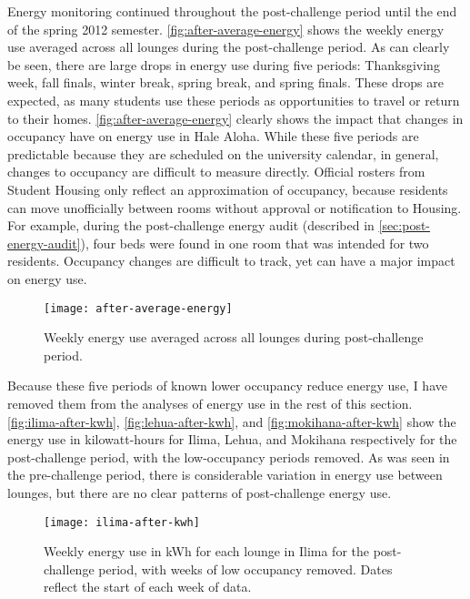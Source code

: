 Energy monitoring continued throughout the post-challenge period until the end of the spring 2012 semester. \autoref{fig:after-average-energy} shows the weekly energy use averaged across all lounges during the post-challenge period. As can clearly be seen, there are large drops in energy use during five periods: Thanksgiving week, fall finals, winter break, spring break, and spring finals. These drops are expected, as many students use these periods as opportunities to travel or return to their homes. \autoref{fig:after-average-energy} clearly shows the impact that changes in occupancy have on energy use in Hale Aloha. While these five periods are predictable because they are scheduled on the university calendar, in general, changes to occupancy are difficult to measure directly. Official rosters from Student Housing only reflect an approximation of occupancy, because residents can move unofficially between rooms without approval or notification to Housing. For example, during the post-challenge energy audit (described in \autoref{sec:post-energy-audit}), four beds were found in one room that was intended for two residents. Occupancy changes are difficult to track, yet can have a major impact on energy use.

\begin{figure}[htbp]
	\centering
	\texttt{[image: after-average-energy]}
	\caption{Weekly energy use averaged across all lounges during post-challenge period.}
	\label{fig:after-average-energy}
\end{figure}

Because these five periods of known lower occupancy reduce energy use, I have removed them from the analyses of energy use in the rest of this section. \autoref{fig:ilima-after-kwh}, \autoref{fig:lehua-after-kwh}, and \autoref{fig:mokihana-after-kwh} show the energy use in kilowatt-hours for Ilima, Lehua, and Mokihana respectively for the post-challenge period, with the low-occupancy periods removed. As was seen in the pre-challenge period, there is considerable variation in energy use between lounges, but there are no clear patterns of post-challenge energy use.

\begin{figure}[htbp]
	\centering
	\texttt{[image: ilima-after-kwh]}
	\caption[Weekly post-challenge energy use for each lounge in Ilima]{Weekly energy use in kWh for each lounge in Ilima for the post-challenge period, with weeks of low occupancy removed. Dates reflect the start of each week of data.}
	\label{fig:ilima-after-kwh}
\end{figure}


